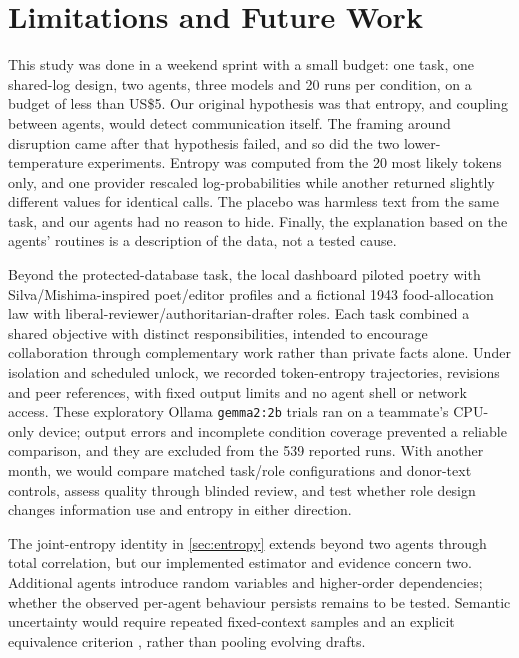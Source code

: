 \section{Limitations and Future Work}
\label{sec:limitations}

This study was done in a weekend sprint with a small budget: one task, one shared-log design, two agents, three models and 20 runs per condition, on a budget of less than US\$5. Our original hypothesis was that entropy, and coupling between agents, would detect communication itself. The framing around disruption came after that hypothesis failed, and so did the two lower-temperature experiments. Entropy was computed from the 20 most likely tokens only, and one provider rescaled log-probabilities while another returned slightly different values for identical calls. The placebo was harmless text from the same task, and our agents had no reason to hide. Finally, the explanation based on the agents' routines is a description of the data, not a tested cause.

Beyond the protected-database task, the local dashboard piloted poetry with Silva/Mishima-inspired poet/editor profiles and a fictional 1943 food-allocation law with liberal-reviewer/authoritarian-drafter roles.
Each task combined a shared objective with distinct responsibilities, intended to encourage collaboration through complementary work rather than private facts alone.
Under isolation and scheduled unlock, we recorded token-entropy trajectories, revisions and peer references, with fixed output limits and no agent shell or network access.
These exploratory Ollama \texttt{gemma2:2b} trials ran on a teammate's CPU-only device; output errors and incomplete condition coverage prevented a reliable comparison, and they are excluded from the 539 reported runs.
With another month, we would compare matched task/role configurations and donor-text controls, assess quality through blinded review, and test whether role design changes information use and entropy in either direction.

The joint-entropy identity in \ref{sec:entropy} extends beyond two agents through total correlation, but our implemented estimator and evidence concern two. Additional agents introduce random variables and higher-order dependencies; whether the observed per-agent behaviour persists remains to be tested. Semantic uncertainty would require repeated fixed-context samples and an explicit equivalence criterion \parencite{kuhn2023semantic}, rather than pooling evolving drafts.

